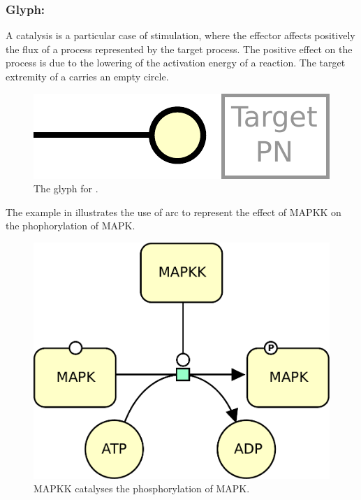 \subsubsection{Glyph: }\label{sec:catalysis}

A catalysis is a particular case of stimulation, where the effector affects
positively the flux of a process represented by the target process. The positive effect on the process is due to the lowering of the activation energy of a reaction. The target extremity of a  carries an empty circle.

\begin{figure}[htb]
  \centering
  \includegraphics[scale = 0.5]{le_images/catalysis}
  \caption{The \PD glyph for .}
  \label{fig:catalysis}
\end{figure}

The example in  illustrates the use of  arc to represent the effect of MAPKK on the phophorylation of MAPK.

\begin{figure}[htb]
  \centering
  \includegraphics[scale = 0.5]{le_images/catalysis-MAPK}
  \caption{MAPKK catalyses the phosphorylation of MAPK.}
  \label{fig:catalysis-MAPK}
\end{figure}


